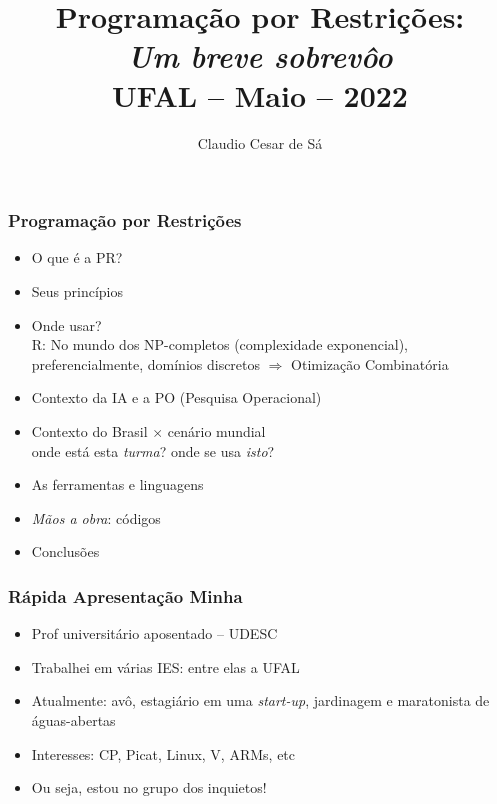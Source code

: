 \documentclass{beamer}
\title[Combinatorial  Optimization] %
{Programação por Restrições: \\ \textit{Um breve sobrevôo}\\ UFAL -- Maio -- 2022}
\author[Claudio Cesar de Sá] 
{Claudio Cesar de Sá}%
\institute[WhatsTV]{Independent Researcher and WhatsTV Inc.}
\date[\today] %
\begin{document}
\begin{frame}
  \titlepage
  
\end{frame}

\begin{frame}[fragile]

\frametitle{Programação por Restrições}

    \begin{itemize}
        \item O que é a PR?
        \item Seus princípios
        \item Onde usar? \\
        R: No mundo dos NP-completos (complexidade exponencial), preferencialmente, domínios discretos $\Rightarrow$ Otimização Combinatória
        \item Contexto da IA e a PO (Pesquisa Operacional)
        \item Contexto do Brasil $\times $ cenário mundial\\ 
        onde está esta {\em turma}? onde se usa {\em isto}?
        \item As ferramentas e linguagens
        \item {\em Mãos a obra}: códigos
        \item Conclusões 
    \end{itemize}

\end{frame}

 \begin{frame}[fragile]

\frametitle{Rápida Apresentação Minha}
\begin{itemize}
    \item Prof universitário aposentado -- UDESC
    \item Trabalhei em várias IES: entre elas a UFAL
    \item Atualmente: avô, estagiário em uma {\em start-up}, jardinagem e maratonista de águas-abertas 
    \item Interesses: CP, Picat, Linux, V, ARMs, etc
    \pause
    \item Ou seja, estou no grupo dos inquietos!
\end{itemize}

\end{frame}
\end{document}
